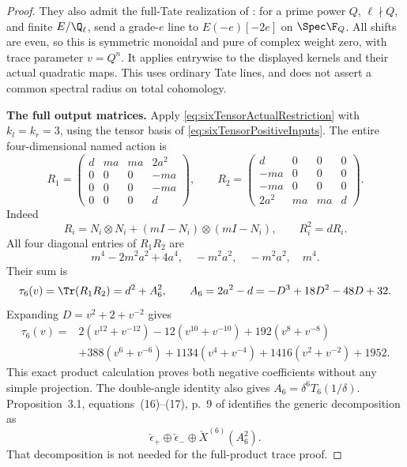 \begin{proof}
They also admit the full-Tate realization of
: for a prime power \(Q\),
\(\ell\nmid Q\), and finite \(E/\Q_\ell\),
send a grade-\(e\) line to \(E(-e)[-2e]\)
on \(\Spec\F_Q\).
All shifts are even, so this is symmetric
monoidal and pure of complex weight zero,
with trace parameter \(v=Q^n\).
It applies entrywise to the displayed kernels
and their actual quadratic maps.
This uses ordinary Tate lines, and does not
assert a common spectral radius on total cohomology.

\par\smallskip\noindent\textbf{The full output matrices.}\quad
Apply \eqref{eq:sixTensorActualRestriction}
with \(k_l=k_r=3\), using the tensor basis
of \eqref{eq:sixTensorPositiveInputs}.
The entire four-dimensional named action is
\begin{equation}\label{eq:sixTensorActualMatrices}
 R_1=\begin{pmatrix}
 d&ma&ma&2a^2\\0&0&0&-ma\\0&0&0&-ma\\0&0&0&d
 \end{pmatrix},\qquad
 R_2=\begin{pmatrix}
 d&0&0&0\\-ma&0&0&0\\-ma&0&0&0\\2a^2&ma&ma&d
 \end{pmatrix}.
\end{equation}
Indeed
\[
 R_i=N_i\otimes N_i+(mI-N_i)\otimes(mI-N_i),
 \qquad R_i^2=dR_i.
\]
All four diagonal entries of \(R_1R_2\) are
\begin{equation}\label{eq:sixTensorFullDiagonal}
 m^4-2m^2a^2+4a^4,\quad -m^2a^2,\quad
              -m^2a^2,\quad m^4.
\end{equation}
Their sum is
\begin{equation}\label{eq:sixTensorTraceIdentity}
 \tau_6(v)=\Tr(R_1R_2)=d^2+A_6^2,
 \qquad
 A_6=2a^2-d=-D^3+18D^2-48D+32.
\end{equation}
Expanding \(D=v^2+2+v^{-2}\) gives
\begin{equation}\label{eq:sixTensorNegativeTrace}
\begin{split}
 \tau_6(v)={}&2(v^{12}+v^{-12})-12(v^{10}+v^{-10})
                  +192(v^8+v^{-8})\\
 &+388(v^6+v^{-6})+1134(v^4+v^{-4})
                  +1416(v^2+v^{-2})+1952.
\end{split}
\end{equation}
This exact product calculation proves both
negative coefficients without any simple projection.
The double-angle identity also gives
\(A_6=\delta^6T_6(1/\delta)\).
Proposition~3.1, equations~(16)--(17), p.~9
of \cite{BlasiakChebyshev} identifies the generic
decomposition as
\[
 \check\epsilon_+\oplus\check\epsilon_-
                 \oplus\check X^{(6)}(A_6^2).
\]
That decomposition is not needed for the
full-product trace proof.


\end{proof}
